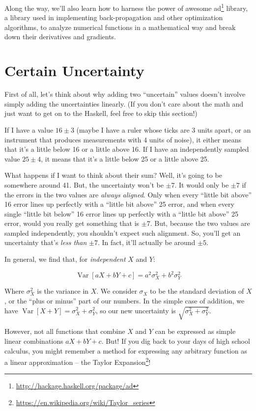 \documentclass[]{article}
\renewcommand{\href}[2]{#2\footnote{\url{#1}}}
\begin{document}
Along the way, we'll also learn how to harness the power of awesome
\href{http://hackage.haskell.org/package/ad}{ad} library, a library used
in implementing back-propagation and other optimization algorithms, to
analyze numerical functions in a mathematical way and break down their
derivatives and gradients.

\section{Certain Uncertainty}\label{certain-uncertainty}

First of all, let's think about why adding two ``uncertain'' values
doesn't involve simply adding the uncertainties linearly. (If you don't
care about the math and just want to get on to the Haskell, feel free to
skip this section!)

If I have a value \(16 \pm 3\) (maybe I have a ruler whose ticks are 3
units apart, or an instrument that produces measurements with 4 units of
noise), it either means that it's a little below 16 or a little above
16. If I have an independently sampled value \(25 \pm 4\), it means that
it's a little below 25 or a little above 25.

What happens if I want to think about their sum? Well, it's going to be
somewhere around 41. But, the uncertainty won't be \(\pm 7\). It would
only be \(\pm 7\) if the errors in the two values are \emph{always
aligned}. Only when every ``little bit above'' 16 error lines up
perfectly with a ``little bit above'' 25 error, and when every single
``little bit below'' 16 error lines up perfectly with a ``little bit
above'' 25 error, would you really get something that is \(\pm 7\). But,
because the two values are sampled independently, you shouldn't expect
such alignment. So, you'll get an uncertainty that's \emph{less than}
\(\pm 7\). In fact, it'll actually be around \(\pm 5\).

In general, we find that, for \emph{independent} \(X\) and \(Y\):

\[
\operatorname{Var}[aX + bY + c] = a^2 \sigma_X^2 + b^2 \sigma_Y^2
\]

Where \(\sigma_X^2\) is the variance in \(X\). We consider \(\sigma_X\)
to be the standard deviation of \(X\), or the ``plus or minus'' part of
our numbers. In the simple case of addition, we have
\(\operatorname{Var}[X + Y] = \sigma_X^2 + \sigma_Y^2\), so our new
uncertainty is \(\sqrt{\sigma_X^2 + \sigma_Y^2}\).

However, not all functions that combine \(X\) and \(Y\) can be expressed
as simple linear combinations \(aX + bY + c\). But! If you dig back to
your days of high school calculus, you might remember a method for
expressing any arbitrary function as a linear approximation -- the
\href{https://en.wikipedia.org/wiki/Taylor_series}{Taylor Expansion}!
\end{document}
